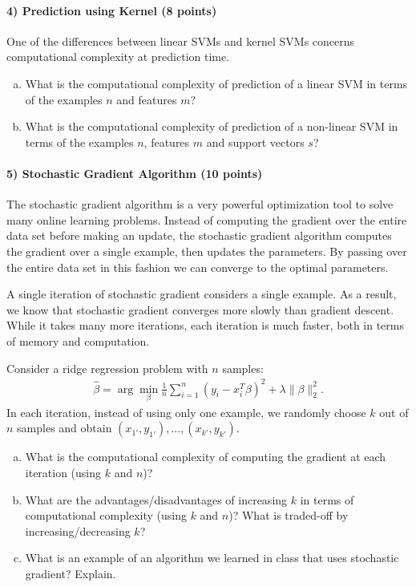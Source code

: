 \documentclass[11pt]{article}
\begin{document}
\paragraph{4) Prediction using Kernel (8 points)} 
One of the differences between linear SVMs and kernel SVMs concerns computational complexity at prediction time.
\begin{enumerate}[(a)]
\item What is the computational complexity of prediction of a linear SVM in terms of the examples $n$ and features $m$?
\item What is the computational complexity of prediction of a non-linear SVM in terms of the examples $n$, features $m$ and support vectors $s$?
\end{enumerate}

\paragraph{5) Stochastic Gradient Algorithm (10 points)}

The stochastic gradient algorithm is a very powerful optimization tool to solve many online learning problems. Instead of computing the gradient over the entire data set before making an update, the stochastic gradient algorithm computes the gradient over a single example, then updates the parameters. By passing over the entire data set in this fashion we can converge to the optimal parameters.

A single iteration of stochastic gradient considers a single example. As a result, we know that stochastic gradient converges more slowly than gradient descent. While it takes many more iterations, each iteration is much faster, both in terms of memory and computation.

Consider a ridge regression problem with $n$ samples:
\begin{align}
\hat{\beta} = \arg\min_{\beta}\frac{1}{n}\sum_{i=1}^n(y_i - x_i^T\beta)^2 + \lambda\|\beta\|_2^2.
\end{align}
In each iteration, instead of using only one example, we randomly choose $k$ out of $n$ samples and obtain $(x_{1'},y_{1'}),...,(x_{k'},y_{k'})$. 
\begin{enumerate}[(a)]
\item What is the computational complexity of computing the gradient at each iteration (using $k$ and $n$)?
\item What are the advantages/disadvantages of increasing $k$ in terms of computational complexity (using $k$ and $n$)? What is traded-off by increasing/decreasing $k$?
\item What is an example of an algorithm we learned in class that uses stochastic gradient? Explain.
\end{enumerate}
\end{document}
